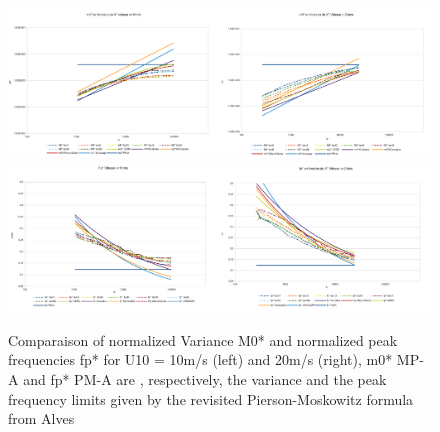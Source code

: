 \begin{figure}[H]
  \centering
  	\includegraphics[width=0.5\textwidth]{M0v10id.pdf}\includegraphics[width=0.5\textwidth]{M0v20id.pdf}\\
  	\includegraphics[width=0.5\textwidth]{fpv10id.pdf}\includegraphics[width=0.5\textwidth]{fpv20id.pdf}\\
      \caption{Comparaison of normalized Variance M0* and normalized peak frequencies fp* for U10 = 10m/s (left) and 20m/s (right), m0* MP-A and fp* PM-A are , respectively, the variance and the peak frequency limits given by the revisited Pierson-Moskowitz formula from Alves \cite{Alves2003}}
\label{variancefet}
\end{figure}

